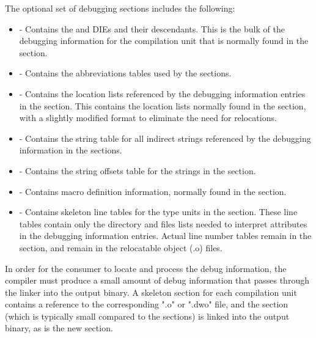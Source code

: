 The optional set of debugging sections includes the following:
\begin{itemize}
\item
\dotdebuginfodwo{} - Contains the \DWTAGcompileunit{} and
\DWTAGtypeunit{} DIEs and
their descendants. This is the bulk of the debugging
information for the compilation unit that is normally found
in the \dotdebuginfo{} section.
\item
\dotdebugabbrevdwo{} - Contains the abbreviations tables used by
the \dotdebuginfodwo{} sections.
\item
\dotdebuglocdwo{} - Contains the location lists referenced by
the debugging information entries in the \dotdebuginfodwo{}
section. This contains the location lists normally found in 
the \dotdebugloc{} section,
with a slightly modified format to eliminate the need for
relocations.
\item
\dotdebugstrdwo{} - Contains the string table for all indirect
strings referenced by the debugging information in the
\dotdebuginfodwo{} sections.
\item
\dotdebugstroffsetsdwo{} - Contains the string offsets table
for the strings in the \dotdebugstrdwo{}{} section.
\item
\dotdebugmacinfodwo{} - Contains macro definition information,
normally found in the \dotdebugmacinfo{} section.
\item
\dotdebuglinedwo{} - Contains skeleton line tables for the type
units in the \dotdebuginfodwo{} section. These line tables
contain only the directory and files lists needed to
interpret \DWATdeclfile{} attributes in the debugging
information entries. Actual line number tables remain in the
\dotdebugline{} section, and remain in the relocatable object
(.o) files.
\end{itemize}

In order for the consumer to locate and process the debug
information, the compiler must produce a small amount of debug
information that passes through the linker into the output
binary. A skeleton \dotdebuginfo{} section for each compilation unit
contains a reference to the corresponding ".o" or ".dwo"
file, and the \dotdebugline{} section (which is typically small
compared to the \dotdebuginfo{} sections) is
linked into the output binary, as is the new \dotdebugaddr{}
section.

